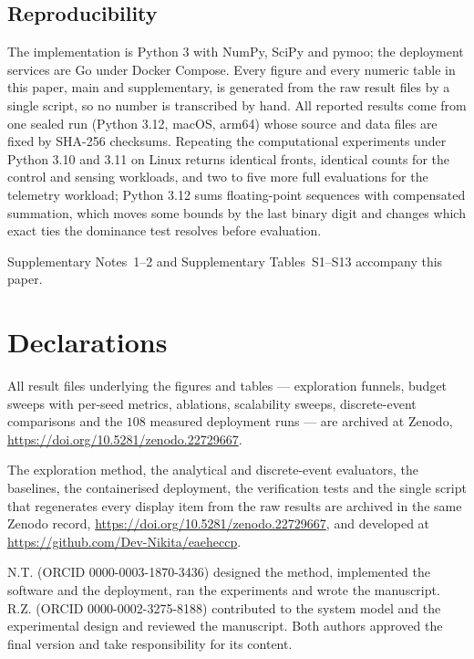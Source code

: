 \documentclass[pdflatex,sn-nature,lineno]{sn-jnl}
\begin{document}
\subsection{Reproducibility}
The implementation is Python 3 with NumPy, SciPy and pymoo; the deployment services are
Go under Docker Compose. Every figure and every numeric table in this paper, main and
supplementary, is generated from the raw result files by a single script, so no number is
transcribed by hand. All reported results come from one sealed run (Python 3.12, macOS,
arm64) whose source and data files are fixed by SHA-256 checksums. Repeating the
computational experiments under Python 3.10 and 3.11 on Linux returns identical fronts,
identical counts for the control and sensing workloads, and two to five more full
evaluations for the telemetry workload; Python 3.12 sums floating-point sequences with
compensated summation, which moves some bounds by the last binary digit and changes
which exact ties the dominance test resolves before evaluation.

\backmatter

Supplementary Notes~1--2 and Supplementary Tables~S1--S13 accompany this paper.

\section*{Declarations}

All result files underlying the figures and tables --- exploration funnels, budget sweeps
with per-seed metrics, ablations, scalability sweeps, discrete-event comparisons and the
$108$ measured deployment runs --- are archived at Zenodo,
\url{https://doi.org/10.5281/zenodo.22729667}.

The exploration method, the analytical and discrete-event evaluators, the baselines, the
containerised deployment, the verification tests and the single script that regenerates
every display item from the raw results are archived in the same Zenodo record,
\url{https://doi.org/10.5281/zenodo.22729667}, and developed at
\url{https://github.com/Dev-Nikita/eaeheccp}.

N.T. (ORCID 0000-0003-1870-3436) designed the method, implemented the software and the
deployment, ran the experiments and wrote the manuscript. R.Z. (ORCID
0000-0002-3275-8188) contributed to the system model and the experimental design and
reviewed the manuscript. Both authors approved the final version and take responsibility
for its content.
\end{document}
